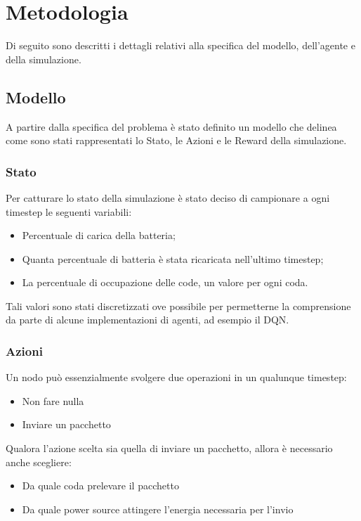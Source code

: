 \documentclass[conference]{IEEEtran}
\begin{document}
\section{Metodologia}
Di seguito sono descritti i dettagli relativi alla specifica del modello, dell'agente e
della simulazione.

\subsection{Modello}
A partire dalla specifica del problema è stato definito un modello che delinea come
sono stati rappresentati lo Stato, le Azioni e le Reward della simulazione.

\subsubsection{Stato}
Per catturare lo stato della simulazione è stato deciso di campionare a ogni timestep le
seguenti variabili:
\begin{itemize}
    \item Percentuale di carica della batteria;
    \item Quanta percentuale di batteria è stata ricaricata nell'ultimo timestep;
    \item La percentuale di occupazione delle code, un valore per ogni coda. 
\end{itemize}
Tali valori sono stati discretizzati ove possibile per permetterne la comprensione da
parte di alcune implementazioni di agenti, ad esempio il DQN.
\subsubsection{Azioni}
Un nodo può essenzialmente svolgere due operazioni in un qualunque timestep:
\begin{itemize}
    \item Non fare nulla
    \item Inviare un pacchetto
\end{itemize}
Qualora l'azione scelta sia quella di inviare un pacchetto, allora è necessario anche
scegliere:
\begin{itemize}
    \item Da quale coda prelevare il pacchetto
    \item Da quale power source attingere l'energia necessaria per l'invio
\end{itemize}
\end{document}
